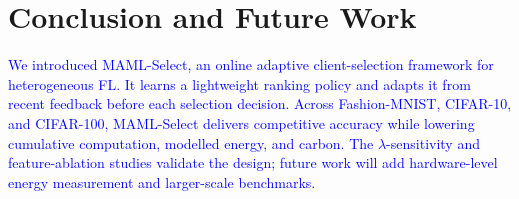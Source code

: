 \documentclass[journal]{IEEEtran}
\newcommand{\revision}[1]{\textcolor{blue}{#1}}
\begin{document}
\FloatBarrier
\section{Conclusion and Future Work}
\revision{We introduced MAML-Select, an online adaptive client-selection framework for heterogeneous FL. It learns a lightweight ranking policy and adapts it from recent feedback before each selection decision. Across Fashion-MNIST, CIFAR-10, and CIFAR-100, MAML-Select delivers competitive accuracy while lowering cumulative computation, modelled energy, and carbon. The $\lambda$-sensitivity and feature-ablation studies validate the design; future work will add hardware-level energy measurement and larger-scale benchmarks.}

\vspace{-1mm}


\end{document}
